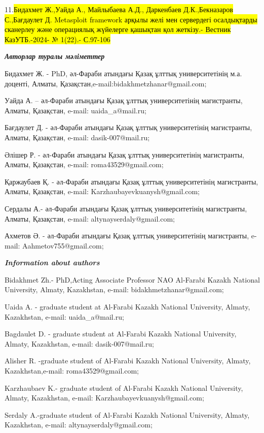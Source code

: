 11.\hl{Бидахмет Ж.,Уайда А., Майлыбаева А.Д., Даркенбаев Д.К.,Бекназаров
С.,Бағдаулет Д. Metasploit framework арқылы желі мен сервердегі
осалдықтарды сканерлеу және операциялық жүйелерге қашықтан қол жеткізу.-
Вестник КазУТБ.-2024- № 1(22).- С.97-106}

\emph{\textbf{Авторлар туралы мәліметтер}}

Бидахмет Ж. - PhD, әл-Фараби атындағы Қазақ ұлттық университетінің м.а.
доценті, Алматы, Қазақстан,e-mail:bidakhmetzhanar@gmail.com;

Уайда А. -- әл-Фараби атындағы Қазақ ұлттық университетінің магистранты,
Алматы, Қазақстан, e-mail: uaida\_a@mail.ru;

Бағдаулет Д. - әл-Фараби атындағы Қазақ ұлттық университетінің
магистранты, Алматы, Қазақстан, e-mail: dasik-007@mail.ru;

Әлішер Р. - әл-Фараби атындағы Қазақ ұлттық университетінің магистранты,
Алматы, Қазақстан, e-mail: roma43529@gmail.com;

Қаржаубаев Қ. - әл-Фараби атындағы Қазақ ұлттық университетінің
магистранты, Алматы, Қазақстан, e-mail: Karzhaubayevkuanysh@gmail.com;

Сердалы А.- әл-Фараби атындағы Қазақ ұлттық университетінің магистранты,
Алматы, Қазақстан, e-mail: altynayserdaly@gmail.com;

Ахметов Ә. - әл-Фараби атындағы Қазақ ұлттық университетінің
магистранты, e-mail: Aahmetov755@gmail.com;

\emph{\textbf{Information about authors}}

Bidakhmet Zh.- PhD,Acting Associate Professor NAO Al-Farabi Kazakh
National University, Almaty, Kazakhstan, e-mail:
bidakhmetzhanar@gmail.com;

Uaida A. - graduate student at Al-Farabi Kazakh National University,
Almaty, Kazakhstan, e-mail: uaida\_a@mail.ru;

Bagdaulet D. - graduate student at Al-Farabi Kazakh National University,
Almaty, Kazakhstan, e-mail: dasik-007@mail.ru;

Alisher R. -graduate student of Al-Farabi Kazakh National University,
Almaty, Kazakhstan,e-mail: roma43529@gmail.com;

Karzhaubaev K.- graduate student of Al-Farabi Kazakh National
University, Almaty, Kazakhstan, e-mail: Karzhaubayevkuanysh@gmail.com;

Serdaly A.-graduate student of Al-Farabi Kazakh National University,
Almaty, Kazakhstan, e-mail: altynayserdaly@gmail.com;

